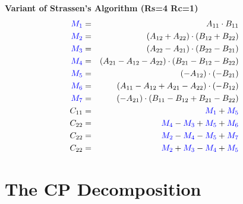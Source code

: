 \documentclass[MS]{wfuthesis}
\begin{document}
\begin{multicols}{2}
                        \textbf{Variant of Strassen's Algorithm (Rs=4 Rc=1)}
                            \begin{eqnarray*}
                                \color{blue} M_1 & = & A_{11}\cdot B_{11} \\
                                \color{blue} M_2 & = & (A_{12} + A_{22})\cdot (B_{12} + B_{22}) \\
                                \color{blue} M_3 & = & (A_{22} - A_{21})\cdot (B_{22} - B_{21}) \\
                                \color{blue} M_4 & = & (A_{21} - A_{12} - A_{22})\cdot (B_{21} - B_{12} - B_{22}) \\
                                \color{blue} M_5 & = & (-A_{12})\cdot (-B_{21}) \\
                                \color{blue} M_6 & = & (A_{11} - A_{12} + A_{21} - A_{22})\cdot (- B_{12}) \\
                                \color{blue} M_7 & = & (- A_{21})\cdot (B_{11} - B_{12} + B_{21} - B_{22}) \\
                                C_{11} & = & \color{blue} M_1 \color{black} + \color{blue} M_5 \\
                                C_{22} & = & \color{blue} M_4 \color{black} - \color{blue} M_3 \color{black} + \color{blue} M_5 \color{black} + \color{blue} M_6 \\
                                C_{22} & = & \color{blue} M_2 \color{black} - \color{blue} M_4 \color{black} - \color{blue} M_5 \color{black} + \color{blue} M_7 \\
                                C_{22} & = & \color{blue} M_2 \color{black} + \color{blue} M_3 \color{black} - \color{blue} M_4 \color{black} + \color{blue} M_5
                            \end{eqnarray*}
                    \end{multicols}
    \newpage





    \chapter{\textbf{The CP Decomposition}}
    \newpage
\end{document}
